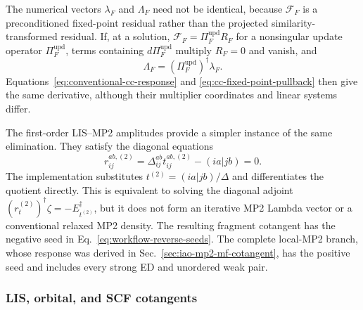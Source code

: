 \documentclass[11pt]{article}
\begin{document}
The numerical vectors $\lambda_F$ and $\Lambda_F$ need not be identical,
because $\mathcal F_F$ is a preconditioned fixed-point residual rather than
the projected similarity-transformed residual.  If, at a solution,
$\mathcal F_F=\Pi_F^{\mathrm{upd}}R_F$ for a nonsingular update operator
$\Pi_F^{\mathrm{upd}}$, terms containing $d\Pi_F^{\mathrm{upd}}$ multiply
$R_F=0$ and vanish, and
\begin{equation}
 \Lambda_F=(\Pi_F^{\mathrm{upd}})^\dagger\lambda_F.
 \label{eq:fixed-point-lambda-map}
\end{equation}
Equations~\eqref{eq:conventional-cc-response} and
\eqref{eq:cc-fixed-point-pullback} then give the same derivative, although
their multiplier coordinates and linear systems differ.

The first-order LIS--MP2 amplitudes provide a simpler instance of the same
elimination.  They satisfy the diagonal equations
\begin{equation}
 r_{ij}^{ab,(2)}
 =\Delta_{ij}^{ab}t_{ij}^{ab,(2)}-(ia|jb)=0.
 \label{eq:lis-mp2-residual}
\end{equation}
The implementation substitutes $t^{(2)}=(ia|jb)/\Delta$ and differentiates
the quotient directly.  This is equivalent to solving the diagonal adjoint
$(r_t^{(2)})^\dagger\zeta=-E_{t^{(2)}}^\dagger$, but it does not form an
iterative MP2 Lambda vector or a conventional relaxed MP2 density.  The
resulting fragment cotangent has the negative seed in
Eq.~\eqref{eq:workflow-reverse-seeds}.  The complete local-MP2 branch, whose
response was derived in Sec.~\ref{sec:iao-mp2-mf-cotangent}, has the positive
seed and includes every strong ED and unordered weak pair.

\subsubsection{LIS, orbital, and SCF cotangents}
\end{document}

